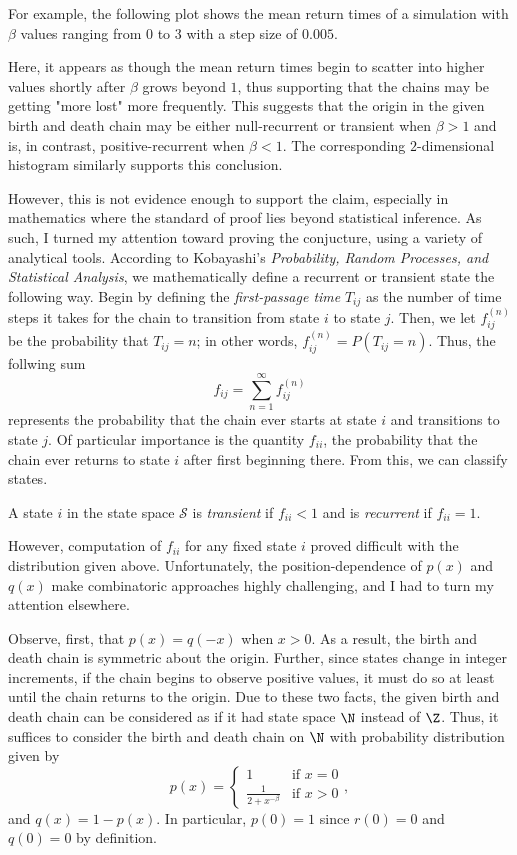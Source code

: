 For example, the following plot shows the mean return times of a simulation with $\beta$ values ranging
from $0$ to $3$ with a step size of $0.005$.

Here, it appears as though the mean return times begin to scatter into higher values shortly after
$\beta$ grows beyond $1$, thus supporting that the chains may be getting "more lost" more frequently.
This suggests that the origin in the given birth and death chain may be either null-recurrent or
transient when $\beta > 1$ and is, in contrast, positive-recurrent when $\beta < 1$. The corresponding
$2$-dimensional histogram similarly supports this conclusion.

However, this is not evidence enough to support the claim, especially in mathematics where the standard
of proof lies beyond statistical inference. As such, I turned my attention toward proving the
conjucture, using a variety of analytical tools. According to Kobayashi's \emph{Probability, Random
Processes, and Statistical Analysis}, we mathematically define a recurrent or transient state the
following way. Begin by defining the \emph{first-passage time} $T_{ij}$ as the number of time steps it
takes for the chain to transition from state $i$ to state $j$. Then, we let $f_{ij}^{(n)}$ be the
probability that $T_{ij} = n$; in other words, $f_{ij}^{(n)} = P(T_{ij} = n)$. Thus, the follwing sum
\[
    f_{ij} = \sum_{n=1}^{\infty} f_{ij}^{(n)}  
\]
represents the probability that the chain ever starts at state $i$ and transitions to state $j$. Of
particular importance is the quantity $f_{ii}$, the probability that the chain ever returns to state $i$
after first beginning there. From this, we can classify states.
\begin{definition}
    A state $i$ in the state space $\mathcal{S}$ is \emph{transient} if $f_{ii} < 1$ and is
    \emph{recurrent} if $f_{ii} = 1$.
\end{definition}
However, computation of $f_{ii}$ for any fixed state $i$ proved difficult with the distribution given
above.  Unfortunately, the position-dependence of $p(x)$ and $q(x)$ make combinatoric approaches highly
challenging, and I had to turn my attention elsewhere.

Observe, first, that $p(x) = q(-x)$ when $x > 0$. As a result, the birth and death chain is symmetric
about the origin. Further, since states change in integer increments, if the chain begins to observe
positive values, it must do so at least until the chain returns to the origin. Due to these two facts,
the given birth and death chain can be considered as if it had state space $\N$ instead of $\Z$. Thus,
it suffices to consider the birth and death chain on $\N$ with probability distribution given by
\[
    p(x) = \begin{cases}
        1 & \text{if } x = 0 \\
        \frac{1}{2+x^{-\beta}} & \text{if } x > 0
    \end{cases},
\]
and $q(x) = 1 - p(x)$. In particular, $p(0) = 1$ since $r(0) = 0$ and $q(0) = 0$ by definition.

